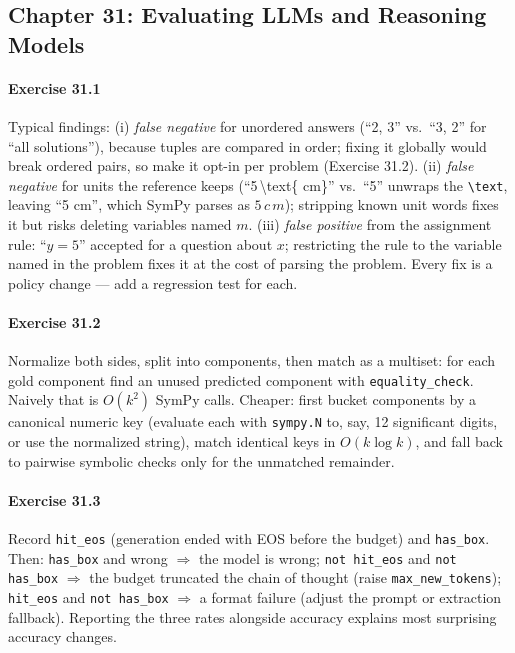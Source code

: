 \subsection*{Chapter 31: Evaluating LLMs and Reasoning Models}

\paragraph{Exercise 31.1} Typical findings: (i) \emph{false negative} for unordered answers
(``2, 3'' vs.\ ``3, 2'' for ``all solutions''), because tuples are compared in order; fixing it
globally would break ordered pairs, so make it opt-in per problem (Exercise 31.2). (ii) \emph{false
negative} for units the reference keeps (``5\,\textbackslash text\{ cm\}'' vs.\ ``5'' unwraps the
\texttt{\textbackslash text}, leaving ``5 cm'', which SymPy parses as $5\,c\,m$); stripping known
unit words fixes it but risks deleting variables named $m$. (iii) \emph{false positive} from the
assignment rule: ``$y = 5$'' accepted for a question about $x$; restricting the rule to the variable
named in the problem fixes it at the cost of parsing the problem. Every fix is a policy change ---
add a regression test for each.

\paragraph{Exercise 31.2} Normalize both sides, split into components, then match as a multiset:
for each gold component find an unused predicted component with \texttt{equality\_check}. Naively
that is $O(k^2)$ SymPy calls. Cheaper: first bucket components by a canonical numeric key (evaluate
each with \texttt{sympy.N} to, say, 12 significant digits, or use the normalized string), match
identical keys in $O(k \log k)$, and fall back to pairwise symbolic checks only for the
unmatched remainder.

\paragraph{Exercise 31.3} Record \texttt{hit\_eos} (generation ended with EOS before the budget) and
\texttt{has\_box}. Then: \texttt{has\_box} and wrong $\Rightarrow$ the model is wrong;
\texttt{not hit\_eos} and \texttt{not has\_box} $\Rightarrow$ the budget truncated the chain of
thought (raise \texttt{max\_new\_tokens}); \texttt{hit\_eos} and \texttt{not has\_box}
$\Rightarrow$ a format failure (adjust the prompt or extraction fallback). Reporting the three rates
alongside accuracy explains most surprising accuracy changes.

